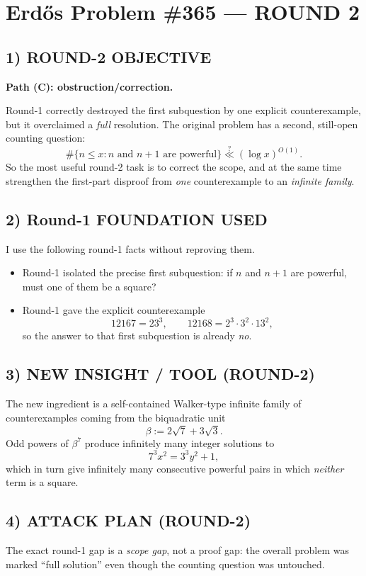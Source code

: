 \section*{Erd\H{o}s Problem \#365 --- ROUND 2}

\subsection*{1) ROUND-2 OBJECTIVE}
\textbf{Path (C): obstruction/correction.}

Round-1 correctly destroyed the first subquestion by one explicit counterexample, but it overclaimed a \emph{full} resolution. The original problem has a second, still-open counting question:
\[
\#\{n\le x : n\mbox{ and }n+1\mbox{ are powerful}\} \stackrel{?}{\ll} (\log x)^{O(1)}.
\]
So the most useful round-2 task is to correct the scope, and at the same time strengthen the first-part disproof from \emph{one} counterexample to an \emph{infinite family}.

\subsection*{2) Round-1 FOUNDATION USED}
I use the following round-1 facts without reproving them.
\begin{itemize}
\item Round-1 isolated the precise first subquestion: if $n$ and $n+1$ are powerful, must one of them be a square?
\item Round-1 gave the explicit counterexample
\[
12167=23^3,\qquad 12168=2^3\cdot 3^2\cdot 13^2,
\]
so the answer to that first subquestion is already \emph{no}.
\end{itemize}

\subsection*{3) NEW INSIGHT / TOOL (ROUND-2)}
The new ingredient is a self-contained Walker-type infinite family of counterexamples coming from the biquadratic unit
\[
\beta:=2\sqrt{7}+3\sqrt{3}.
\]
Odd powers of $\beta^7$ produce infinitely many integer solutions to
\[
7^3x^2=3^3y^2+1,
\]
which in turn give infinitely many consecutive powerful pairs in which \emph{neither} term is a square.

\subsection*{4) ATTACK PLAN (ROUND-2)}
The exact round-1 gap is a \emph{scope gap}, not a proof gap: the overall problem was marked ``full solution'' even though the counting question was untouched.

